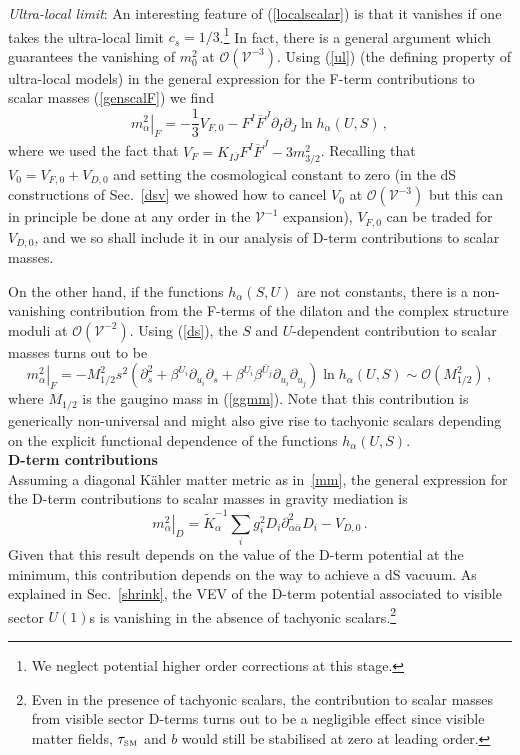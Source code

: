 \documentclass[11pt,a4paper]{article}
\newcommand{\be}{\begin{equation}}
\newcommand{\ee}{\end{equation}}
\def\SM{{\scriptscriptstyle \rm SM}}
\newcommand\vo{{\mathcal{V}}}
\newcommand{\mc}{\mathcal}
\begin{document}
\medskip
\emph{Ultra-local limit}: An interesting feature of (\ref{localscalar}) is that it vanishes if one takes the ultra-local limit
$c_s= 1/3$.\footnote{We neglect potential higher order corrections at this stage.} In fact, there is a general argument \cite{Blumenhagen:2009gk} which guarantees the vanishing of $m_0^2$
at $\mc{O}(\vo^{-3})$. Using (\ref{ul}) (the defining property of ultra-local models)
in the general expression for the F-term contributions to scalar masses (\ref{genscalF}) we find
\be
\left.m_\alpha^2\right|_F = - \frac 13 V_{F,0} - F^I \overline{F}^{\overline{J}} \partial_I \partial_{\overline{J}} \ln h_\alpha(U,S)\,,
\label{ulsm2}
\ee
where we used the fact that $V_F= K_{I\overline{J}}F^I \overline{F}^{\overline{J}}- 3 m_{3/2}^2$.
Recalling that $V_0 = V_{F,0} + V_{D,0}$ and setting the cosmological constant to zero (in the dS constructions of Sec.~\ref{dsv} we showed how to cancel $V_0$ at $\mc{O}(\vo^{-3})$ but this can in principle be done at any order in the $\vo^{-1}$ expansion), $V_{F,0}$ can be traded for $V_{D,0}$,
and we so shall include it in our analysis of D-term contributions to scalar masses.

On the other hand, if the functions $h_\alpha(S,U)$ are not constants, there is a non-vanishing contribution
from the F-terms of the dilaton and the complex structure moduli at $\mc{O}(\vo^{-2})$. Using (\ref{ds}),
the $S$ and $U$-dependent contribution to scalar masses turns out to be
\be
\left.m_\alpha^2\right|_F =  - M_{1/2}^2 s^2 \left(\partial_s^2+\beta^{U_i}\partial_{u_i} \partial_s
+ \beta^{U_i}\beta^{\overline{U}_j}\partial_{u_i} \partial_{u_j}\right) \ln h_\alpha(U,S)\sim \mc{O}\left(M_{1/2}^2\right)\,,
\label{ulsm3}
\ee
where $M_{1/2}$ is the gaugino mass in (\ref{ggmm}). Note that this contribution is generically non-universal
and might also give rise to tachyonic scalars depending on the explicit functional dependence of the functions $h_\alpha(U,S)$.\\

\noindent \textbf{D-term contributions}
\medskip\\
Assuming a diagonal K\"ahler matter metric as in~\eqref{mm}, the general expression for the D-term contributions to scalar masses in gravity mediation is \cite{Dudas:2005vv}
\be
\left.m_\alpha^2\right|_D = \tilde{K}_\alpha^{-1} \sum_i g_i^2 D_i \partial^2_{\alpha \overline{\alpha}} D_i- V_{D,0}\,.
\label{genscalD}
\ee
Given that this result depends on the value of the D-term potential at the minimum, this contribution depends on the way to achieve a dS vacuum.
As explained in Sec.~\ref{shrink}, the VEV of the D-term potential associated to visible sector $U(1)$s is vanishing in the absence of tachyonic scalars.\footnote{Even in the presence of tachyonic scalars, the contribution to scalar masses from visible sector D-terms turns out to be a negligible effect since visible matter fields, $\tau_\SM$ and $b$ would still be stabilised at zero at leading order.}
\end{document}
